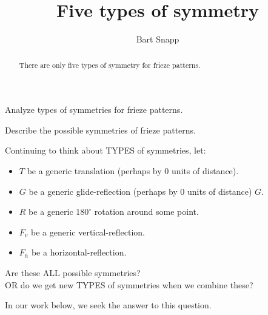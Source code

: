 \documentclass[noauthor,nooutcomes,hints,handout]{ximera}
\author{Bart Snapp}
\title{Five types of symmetry}
\begin{document}
\begin{abstract}
  There are only five types of symmetry for frieze patterns.
\end{abstract}
\maketitle

\begin{listOutcomes}
\item Analyze types of symmetries for frieze patterns.
\item Describe the possible symmetries of frieze patterns.
\end{listOutcomes}

Continuing to think about TYPES of symmetries, let:
\begin{itemize}
  \item $T$ be a generic translation (perhaps by $0$ units of
    distance).
  \item $G$ be a generic glide-reflection (perhaps by $0$ units of
    distance) $G$.
  \item $R$ be a generic $180^\circ$ rotation around some point.
  \item $F_v$ be a generic vertical-reflection.
  \item $F_h$ be a horizontal-reflection. 
\end{itemize}
\begin{center}
  Are these ALL possible symmetries? \\
  OR do we get new TYPES of
symmetries when we combine these?
\end{center}
In our work below, we seek the answer to this question.




\mynewpage
\end{document}
